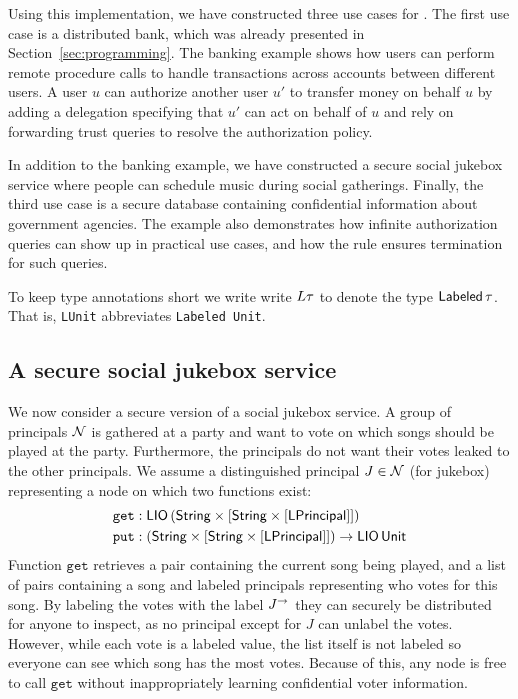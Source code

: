Using this implementation, we have constructed three use cases for \lang. The first use case is a distributed bank, which was already presented in Section~\ref{sec:programming}. The banking example shows how users can perform remote procedure calls to handle transactions across accounts between different users. A user $u$ can authorize another user $u'$ to transfer money on behalf $u$ by adding a delegation specifying that $u'$ can act on behalf of $u$ and rely on forwarding trust queries to resolve the authorization policy.

In addition to the banking example, we have constructed a secure social jukebox service where people can schedule music during social gatherings. Finally, the third use case is a secure database containing confidential information about government agencies. The example also demonstrates how infinite authorization queries can show up in practical use cases, and how the  rule ensures termination for such queries.

To keep type annotations short we write write $L\tau$ to denote the type $\mathsf{Labeled}\,\tau$. That is, \lstinline|LUnit| abbreviates \lstinline|Labeled Unit|.

\subsection{A secure social jukebox service}\label{subsec:jukebox}
We now consider a secure version of a social jukebox service. A group of principals $\mathcal{N}$ is gathered at a party and want to vote on which songs should be played at the party. Furthermore, the principals do not want their votes leaked to the other principals. We assume a distinguished principal $J \in \mathcal{N}$ (for jukebox) representing a node on which two functions exist:
\begin{align*}
\mathtt{get}&: \mathsf{LIO}\,(\mathsf{String} \times \lbrack\mathsf{String} \times \lbrack\mathsf{LPrincipal}\rbrack\rbrack)\\
\mathtt{put}&: (\mathsf{String} \times \lbrack\mathsf{String} \times \lbrack\mathsf{LPrincipal}\rbrack\rbrack) \to \mathsf{LIO}\,\mathsf{Unit}
\end{align*}
Function $\mathtt{get}$ retrieves a pair containing the current song being played, and a list of pairs containing a song and labeled principals representing who votes for this song. By labeling the votes with the label $J^{\rightarrow}$ they can securely be distributed for anyone to inspect, as no principal except for $J$ can unlabel the votes. However, while each vote is a labeled value, the list itself is not labeled so everyone can see which song has the most votes. Because of this, any node is free to call $\mathtt{get}$ without inappropriately learning confidential voter information.


